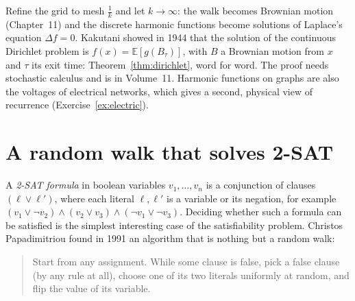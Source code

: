 \begin{remark}
Refine the grid to mesh $\frac1k$ and let $k\to\infty$: the walk becomes Brownian motion (Chapter~11) and the discrete harmonic
functions become solutions of Laplace's equation $\Delta f=0$. Kakutani showed in 1944 that the solution of the continuous Dirichlet
problem is $f(x)=\mathbb E[g(B_\tau)]$, with $B$ a Brownian motion from $x$ and $\tau$ its exit time: Theorem~\ref{thm:dirichlet}, word for word. The
proof needs stochastic calculus and is in Volume~11. Harmonic functions on graphs are also the voltages of electrical
networks, which gives a second, physical view of recurrence (Exercise~\ref{ex:electric}).
\end{remark}

\section{A random walk that solves 2-SAT}

A \emph{2-SAT formula} in boolean variables $v_1,\dots,v_n$ is a conjunction of clauses $(\ell\vee\ell')$, where each literal $\ell,\ell'$ is a variable or
its negation, for example $(v_1\vee\neg v_2)\wedge(v_2\vee v_3)\wedge(\neg v_1\vee\neg v_3)$. Deciding whether such a formula can be satisfied is the
simplest interesting case of the satisfiability problem. Christos Papadimitriou found in 1991 an algorithm that
is nothing but a random walk:
\begin{quote}
Start from any assignment. While some clause is false, pick a false clause (by any rule at all), choose one of
its two literals uniformly at random, and flip the value of its variable.
\end{quote}

